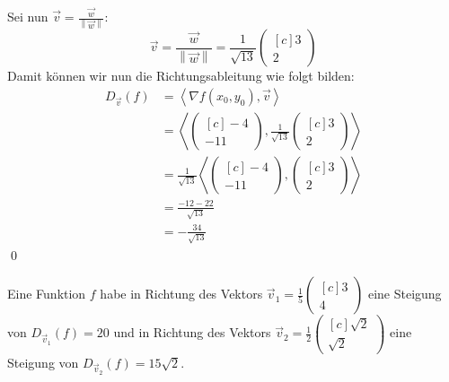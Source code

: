 \documentclass[answers]{exam}
\newcommand{\norm}[1]{\left\| #1 \right\|}
\newcommand{\scalarprod}[1]{\left\langle #1 \right\rangle}
\newcommand{\vektor}[1]{\begin{pmatrix*}[c] #1 \end{pmatrix*}}
\begin{document}
\begin{questions}
\begin{solution}
        Sei nun $\vec{v} = \frac{\vec{w}}{\norm{\vec{w}}}$:
        $$
            \vec{v} = \frac{\vec{w}}{\norm{\vec{w}}} = \frac{1}{\sqrt{13}} \vektor{3  \\ 2}
        $$
        Damit können wir nun die Richtungsableitung wie folgt bilden:
        $$
            \begin{aligned}
                D_{\vec{v}}(f) & = \scalarprod{\nabla f(x_0, y_0), \vec{v}}    \\
                               & = \scalarprod{\vektor{-4                      \\ -11},  \frac{1}{\sqrt{13}} \vektor{3  \\ 2}} \\
                               & =  \frac{1}{\sqrt{13}} \scalarprod{\vektor{-4 \\ -11}, \vektor{3  \\ 2}} \\
                               & =  \frac{-12 -22}{\sqrt{13}}                  \\
                               & =  -\frac{34}{\sqrt{13}}
            \end{aligned}
        $$\qed
    \end{solution}

    \newpage

    \question
    Eine Funktion $f$ habe in Richtung des Vektors $\vec{v}_1 = \frac{1}{5}\vektor{3 \\ 4}$ eine Steigung von $D_{\vec{v}_1}(f) = 20$ und in Richtung des Vektors $\vec{v}_2 = \frac{1}{2}\vektor{\sqrt{2} \\ \sqrt{2}}$ eine Steigung von $D_{\vec{v}_2}(f) = 15\sqrt{2}$.

    \begin{parts}

\end{parts}
\end{questions}
\end{document}

